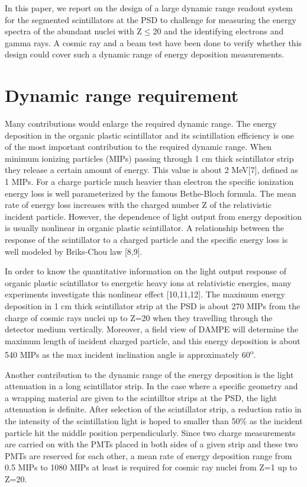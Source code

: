 \documentclass[5p, times]{elsarticle}
\begin{document}
In this paper, we report on the design of a large dynamic range readout system for the segmented scintillators at the
PSD to challenge for measuring the energy spectra of the abundant nuclei with Z${\leq}$20 and the identifying electrons
and gamma rays. A cosmic ray and a beam test have been done to verify whether this design could cover such a dynamic
range of energy deposition measurements.

\section{Dynamic range requirement}
\label{sec:requirement}

Many contributions would enlarge the required dynamic range. The energy deposition in the organic plastic scintillator
and its scintillation efficiency is one of the most important contribution to the required dynamic range. When minimum
ionizing particles (MIPs) passing through 1 cm thick scintillator strip they release a certain amount of energy. This
value is about 2 MeV[7], defined as 1 MIPs. For a charge particle much heavier than electron the specific ionization
energy loss is well parameterized by the famous Bethe-Bloch formula. The mean rate of energy loss increases with the
charged number Z of the relativistic incident particle. However, the dependence of light output from energy deposition
is usually nonlinear in organic plastic scintillator. A relationship between the response of the scintillator to a
charged particle and the specific energy loss is well modeled by Briks-Chou law [8,9]. 

In order to know the quantitative information on the light output response of organic plastic scintillator to energetic
heavy ions at relativistic energies, many experiments investigate this nonlinear effect [10,11,12]. The maximum energy
deposition in 1 cm thick scintillator strip at the PSD is about 270 MIPs from the charge of cosmic rays nuclei up to
Z=20 when they travelling through the detector medium vertically. Moreover, a field view of DAMPE will determine the
maximum length of incident charged particle, and this energy deposition is about 540 MIPs as the max incident
inclination angle is approximately 60\textsuperscript{o}.

Another contribution to the dynamic range of the energy deposition is the light attenuation in a long scintillator
strip. In the case where a specific geometry and a wrapping material are given to the scintilltor strips at the PSD,
the light attenuation is definite. After selection of the scintillator strip, a reduction ratio in the intensity of the
scintillation light is hoped to smaller than 50\% as the incident particle hit the middle position perpendicularly.
Since two charge measurements are carried on with the PMTs placed in both sides of a given strip and these two PMTs are
reserved for each other, a mean rate of energy deposition range from 0.5 MIPs to 1080 MIPs at least is required for
cosmic ray nuclei from Z=1 up to Z=20.
\end{document}
